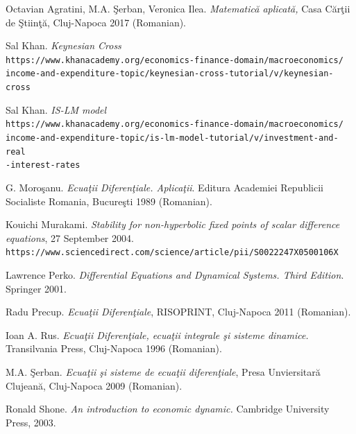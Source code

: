 \documentclass[a4paper,12pt]{report}
\begin{document}
\begin{thebibliography}{9}

  Octavian Agratini, M.A. \c{S}erban, Veronica Ilea. \textit{Matematic\u{a} aplicat\u{a},} Casa C\u{a}r\c{t}ii de \c{S}tiin\c{t}\u{a}, Cluj-Napoca 2017 (Romanian). 

 Sal Khan. \textit{Keynesian Cross}
 \\\texttt{https://www.khanacademy.org/economics-finance-domain/macroeconomics/\\income-and-expenditure-topic/keynesian-cross-tutorial/v/keynesian-cross}
 
 Sal Khan. \textit{IS-LM model}
 \\\texttt{https://www.khanacademy.org/economics-finance-domain/macroeconomics/\\income-and-expenditure-topic/is-lm-model-tutorial/v/investment-and-real\\-interest-rates}
 
 G. Moro\c{s}anu. \textit{Ecua\c{t}ii Diferen\c{t}iale. Aplica\c{t}ii}. Editura Academiei Republicii Socialiste Romania, Bucure\c{s}ti 1989 (Romanian).
 
 Kouichi Murakami. \textit{Stability for non-hyperbolic fixed points of scalar difference equations}, 27 September 2004.
 \\\texttt{https://www.sciencedirect.com/science/article/pii/S0022247X0500106X}
 
 Lawrence Perko. \textit{Differential Equations and Dynamical Systems. Third Edition}. Springer 2001.
 
 Radu Precup. \textit{Ecua\c{t}ii Diferen\c{t}iale}, RISOPRINT, Cluj-Napoca 2011 (Romanian).
 
 Ioan A. Rus. \textit{Ecua\c{t}ii Diferen\c{t}iale, ecua\c{t}ii integrale \c{s}i sisteme dinamice.} Transilvania Press, Cluj-Napoca 1996 (Romanian).

  M.A. \c{S}erban. \textit{Ecua\c{t}ii \c{s}i sisteme de ecua\c{t}ii diferen\c{t}iale}, Presa Unviersitar\u{a} Clujean\u{a}, Cluj-Napoca 
  2009 (Romanian).
  
 
 Ronald Shone. \textit{An introduction to economic dynamic.} Cambridge University Press, 2003.


\end{thebibliography}
\end{document}
